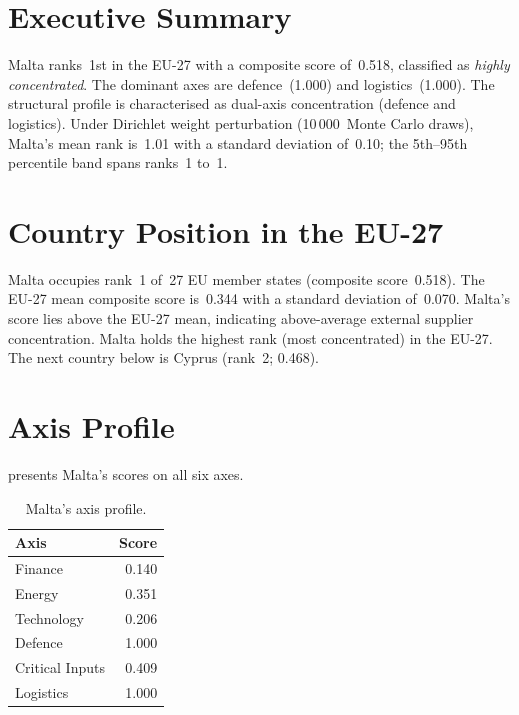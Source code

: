 \documentclass[12pt,a4paper]{article}
\begin{document}
\hypersetup{pageanchor=true}
\pagestyle{fancy}
\renewcommand{\headrulewidth}{0.4pt}


\section{Executive Summary}
\label{sec:summary}

Malta ranks~1st in the EU-27 with a composite \ISI score of~0.518, classified as \emph{highly concentrated}.  The dominant axes are defence~(1.000) and logistics~(1.000).  The structural profile is characterised as dual-axis concentration (defence and logistics).  Under Dirichlet weight perturbation (10\,000~Monte Carlo draws), Malta's mean rank is~1.01 with a standard deviation of~0.10; the 5th--95th percentile band spans ranks~1 to~1.


\section{Country Position in the EU-27}
\label{sec:position}

Malta occupies rank~1 of~27 EU member states (composite score~0.518).  The EU-27 mean composite score is~0.344 with a standard deviation of~0.070.  Malta's score lies above the EU-27 mean, indicating above-average external supplier concentration.  Malta holds the highest rank (most concentrated) in the EU-27.  The next country below is Cyprus (rank~2; 0.468).


\section{Axis Profile}
\label{sec:axis-profile}

 presents Malta's scores on all six \ISI axes.

\begin{table}[htbp]
\centering\small
\caption{Malta's \ISI axis profile.}
\label{tab:axis-profile}
\begin{tabular}{@{}lr@{}}
\toprule
\textbf{Axis} & \textbf{Score} \\
\midrule
    Finance           & 0.140 \\
    Energy            & 0.351 \\
    Technology        & 0.206 \\
    Defence           & 1.000 \\
    Critical Inputs   & 0.409 \\
    Logistics         & 1.000 \\
\bottomrule
\end{tabular}
\end{table}
\end{document}
